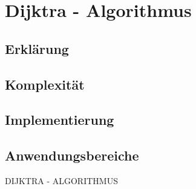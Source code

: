 \chapter{Dijktra - Algorithmus}

\section{Erklärung}

\section{Komplexität}

\section{Implementierung}

\section{Anwendungsbereiche}

DIJKTRA - ALGORITHMUS
